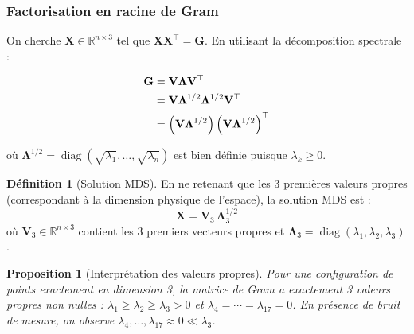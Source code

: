 \documentclass[12pt, a4paper]{article}
\theoremstyle{plain}
\newtheorem{proposition}[theorem]{Proposition}
\theoremstyle{definition}
\newtheorem{definition}[theorem]{Définition}
\newcommand{\R}{\mathbb{R}}
\newcommand{\mat}[1]{\mathbf{#1}}
\newcommand{\Gram}{\mat{G}}
\begin{document}
\subsubsection{Factorisation en racine de Gram}

On cherche $\mat{X} \in \R^{n\times 3}$ tel que $\mat{X}\mat{X}^\top = \Gram$.
En utilisant la décomposition spectrale :

\begin{align}
    \Gram &= \mat{V}\mat{\Lambda}\mat{V}^\top \notag\\
    &= \mat{V}\mat{\Lambda}^{1/2}\mat{\Lambda}^{1/2}\mat{V}^\top \notag\\
    &= \left(\mat{V}\mat{\Lambda}^{1/2}\right)
       \left(\mat{V}\mat{\Lambda}^{1/2}\right)^\top
\end{align}

où $\mat{\Lambda}^{1/2} = \operatorname{diag}(\sqrt{\lambda_1}, \ldots,
\sqrt{\lambda_n})$ est bien définie puisque $\lambda_k \geq 0$.

\begin{definition}[Solution MDS]
    En ne retenant que les 3 premières valeurs propres (correspondant à la
    dimension physique de l'espace), la solution MDS est :
    \begin{equation}
        \boxed{\mat{X} = \mat{V}_3\,\mat{\Lambda}_3^{1/2}}
    \end{equation}
    où $\mat{V}_3 \in \R^{n\times 3}$ contient les 3 premiers vecteurs propres
    et $\mat{\Lambda}_3 = \operatorname{diag}(\lambda_1, \lambda_2, \lambda_3)$.
\end{definition}

\begin{proposition}[Interprétation des valeurs propres]\label{prop:eigenvalues}
    Pour une configuration de points exactement en dimension 3, la matrice de
    Gram a exactement 3 valeurs propres non nulles : $\lambda_1 \geq \lambda_2
    \geq \lambda_3 > 0$ et $\lambda_4 = \cdots = \lambda_{17} = 0$.
    En présence de bruit de mesure, on observe $\lambda_4, \ldots,
    \lambda_{17} \approx 0 \ll \lambda_3$.
\end{proposition}
\end{document}
